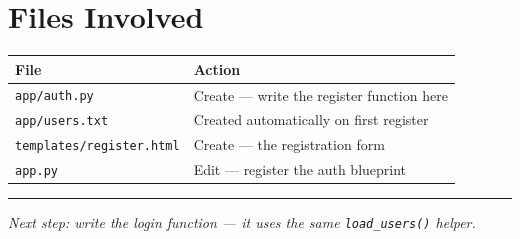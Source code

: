 \documentclass[12pt, a4paper]{article}
\begin{document}
\section{Files Involved}

\begin{center}
\begin{tabular}{ll}
\toprule
\textbf{File} & \textbf{Action} \\
\midrule
\texttt{app/auth.py}             & Create --- write the register function here \\
\texttt{app/users.txt}           & Created automatically on first register \\
\texttt{templates/register.html} & Create --- the registration form \\
\texttt{app.py}                  & Edit --- register the auth blueprint \\
\bottomrule
\end{tabular}
\end{center}

\vspace{2em}
\hrule
\vspace{0.5em}
{\small \textit{Next step: write the login function --- it uses the same \texttt{load\_users()} helper.}}
\end{document}
